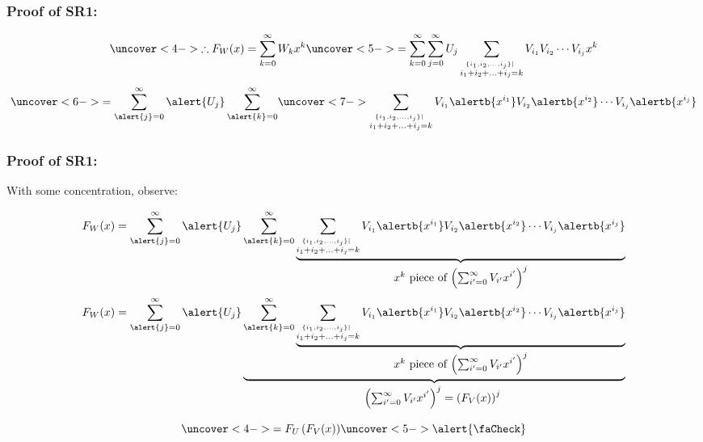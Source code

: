 \begin{frame}[label=]
  \frametitle{Proof of SR1:}

  $$
  \uncover<4->{
    \therefore
    F_W(x) = \sum_{k=0}^\infty W_k x^k
  }
  \uncover<5->{
    =
    \sum_{k=0}^\infty
    \sum_{j=0}^{\infty} U_j 
    \sum_{\stackrel{\{i_1, i_2, \ldots, i_j \} |\ }{{i_1+i_2+\ldots+i_j = k}}} 
    V_{i_1} V_{i_2} \cdots V_{i_j}
    x^k
  }
  $$  
  $$
  \uncover<6->{
    =
    \sum_{\alert{j}=0}^{\infty} 
    \alert{U_j}
    \sum_{\alert{k}=0}^\infty
  }
  \uncover<7->{
    \sum_{\stackrel{\{i_1, i_2, \ldots, i_j \} |\ }{{i_1+i_2+\ldots+i_j = k}}} 
    V_{i_1} \alertb{x^{i_1}}
    V_{i_2} \alertb{x^{i_2}}
    \cdots 
    V_{i_j} \alertb{x^{i_j}}
  }
  $$  
\end{frame}


\begin{frame}[label=]
  \frametitle{Proof of SR1:}

  With some concentration, observe:
  \begin{overprint}
  $$
  F_W(x) = 
  \sum_{\alert{j}=0}^{\infty} 
  \alert{U_j}
    \sum_{\alert{k}=0}^\infty
    \underbrace{
    \sum_{\stackrel{\{i_1, i_2, \ldots, i_j \} |\ }{{i_1+i_2+\ldots+i_j = k}}} 
    V_{i_1} \alertb{x^{i_1}}
    V_{i_2} \alertb{x^{i_2}}
    \cdots 
    V_{i_j} \alertb{x^{i_j}}
  }_{
    \mbox{$x^k$ piece of $\left( \sum_{i'=0}^\infty V_{i'}x^{i'}\right)^j$}
  }
  $$
  $$
  F_W(x) = 
  \sum_{\alert{j}=0}^{\infty} 
  \alert{U_j}
  \underbrace{
    \sum_{\alert{k}=0}^\infty
    \underbrace{
      \sum_{\stackrel{\{i_1, i_2, \ldots, i_j \} |\ }{{i_1+i_2+\ldots+i_j = k}}} 
      V_{i_1} \alertb{x^{i_1}}
      V_{i_2} \alertb{x^{i_2}}
      \cdots 
      V_{i_j} \alertb{x^{i_j}}
    }_{ %
      \mbox{$x^k$ piece of $\left( \sum_{i'=0}^\infty V_{i'}x^{i'}\right)^j$}
    }
  }_{ %
    \mbox{$\left( \sum_{i'=0}^{\infty} V_{i'}x^{i'}\right)^j = \left(F_V(x) \right)^j$ }
  } 
  $$
  \end{overprint}
  $$
  \uncover<4->{
    =
    F_U \left( F_V(x) \right)
  }
  \uncover<5->{
  \alert{\faCheck}
  }
  $$

\end{frame}

